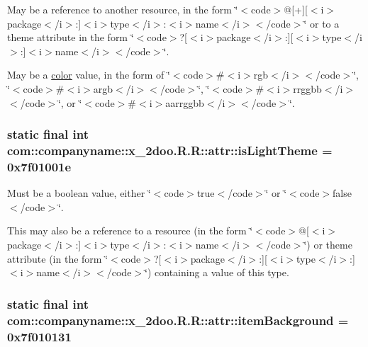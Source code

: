 May be a reference to another resource, in the form \char`\"{}$<$code$>$@\mbox{[}+\mbox{]}\mbox{[}$<$i$>$package$<$/i$>$:\mbox{]}$<$i$>$type$<$/i$>$:$<$i$>$name$<$/i$>$$<$/code$>$\char`\"{} or to a theme attribute in the form \char`\"{}$<$code$>$?\mbox{[}$<$i$>$package$<$/i$>$:\mbox{]}\mbox{[}$<$i$>$type$<$/i$>$:\mbox{]}$<$i$>$name$<$/i$>$$<$/code$>$\char`\"{}. 

May be a \hyperlink{classcom_1_1companyname_1_1x__2doo_1_1_r_1_1color}{color} value, in the form of \char`\"{}$<$code$>$\#$<$i$>$rgb$<$/i$>$$<$/code$>$\char`\"{}, \char`\"{}$<$code$>$\#$<$i$>$argb$<$/i$>$$<$/code$>$\char`\"{}, \char`\"{}$<$code$>$\#$<$i$>$rrggbb$<$/i$>$$<$/code$>$\char`\"{}, or \char`\"{}$<$code$>$\#$<$i$>$aarrggbb$<$/i$>$$<$/code$>$\char`\"{}. \hypertarget{classcom_1_1companyname_1_1x__2doo_1_1_r_1_1attr_721250edac368201ff4b4416d9ac4bf6}{
\subsubsection[{isLightTheme}]{\setlength{\rightskip}{0pt plus 5cm}static final int com::companyname::x\_\-2doo.R.R::attr::isLightTheme = 0x7f01001e}}
\label{classcom_1_1companyname_1_1x__2doo_1_1_r_1_1attr_721250edac368201ff4b4416d9ac4bf6}


Must be a boolean value, either \char`\"{}$<$code$>$true$<$/code$>$\char`\"{} or \char`\"{}$<$code$>$false$<$/code$>$\char`\"{}. 

This may also be a reference to a resource (in the form \char`\"{}$<$code$>$@\mbox{[}$<$i$>$package$<$/i$>$:\mbox{]}$<$i$>$type$<$/i$>$:$<$i$>$name$<$/i$>$$<$/code$>$\char`\"{}) or theme attribute (in the form \char`\"{}$<$code$>$?\mbox{[}$<$i$>$package$<$/i$>$:\mbox{]}\mbox{[}$<$i$>$type$<$/i$>$:\mbox{]}$<$i$>$name$<$/i$>$$<$/code$>$\char`\"{}) containing a value of this type. \hypertarget{classcom_1_1companyname_1_1x__2doo_1_1_r_1_1attr_c3fdfd3a1290e179f9d4db208e3c6bc7}{
\subsubsection[{itemBackground}]{\setlength{\rightskip}{0pt plus 5cm}static final int com::companyname::x\_\-2doo.R.R::attr::itemBackground = 0x7f010131}}
\label{classcom_1_1companyname_1_1x__2doo_1_1_r_1_1attr_c3fdfd3a1290e179f9d4db208e3c6bc7}


